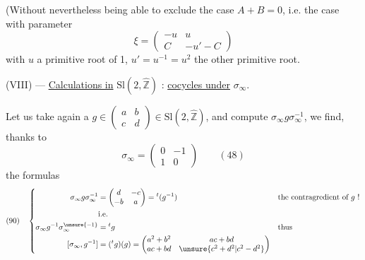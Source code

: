 
(Without nevertheless being able to exclude the case
$A+B=0$, 
i.e. the case with  parameter
\[
\xi=\begin{pmatrix}-u&u\\C&-u'-C\end{pmatrix}
\]
with $u$ a primitive  root of 1,
$u'=u^{-1}=u^2$ the other primitive root.


(VIII) --- \uline{Calculations in} $\mathrm{Sl}(2,\widehat{\mathbb Z})$ : \uline{cocycles under} $\sigma_\infty$.

Let us take again a $g\in\begin{pmatrix}a&b\\c&d\end{pmatrix}\in\mathrm{Sl}(2,\widehat{\mathbb Z})$,
and compute $\sigma_\infty g\sigma_\infty^{-1}$, we find, thanks to
\[
\sigma_\infty=\begin{pmatrix}0&-1\\1&0\end{pmatrix}\qquad (48)
\]
the formulas
\[
(90)\quad\left\{
\begin{aligned}
\sigma_\infty g\sigma_\infty^{-1}
&=\begin{pmatrix}d&-c\\-b&a\end{pmatrix}={}^t(g^{-1})
&&\text{the contragredient of $g$ !}\\
&\text{i.e.}\\
\sigma_\infty g^{-1}\sigma_\infty^{\unsure{-1}}
&={}^t g&&\text{thus}\\
[\sigma_\infty,g^{-1}]&=({}^t g)(g)
=\begin{pmatrix}a^2+b^2&ac+bd\\ac+bd&\unsure{c^2+d^2|c^2-d^2}\end{pmatrix}
\end{aligned}\right.
\]


